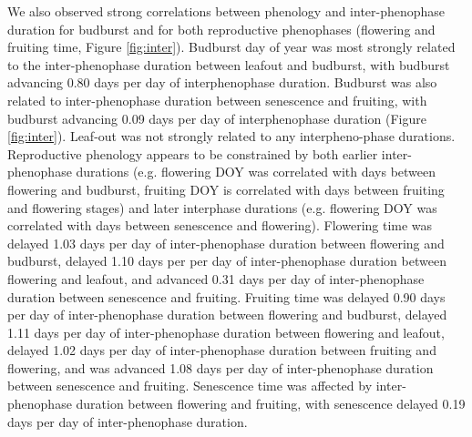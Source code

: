 \documentclass{article}
\begin{document}
\par We also observed strong correlations between phenology and inter-phenophase duration for budburst and for both reproductive phenophases (flowering and fruiting time, Figure \ref{fig:inter}). Budburst day of year was most strongly related to the inter-phenophase duration between leafout and budburst, with budburst advancing 0.80 days per day of interphenophase duration.  Budburst was also related to inter-phenophase duration between senescence and fruiting, with budburst advancing 0.09 days per day of interphenophase duration (Figure \ref{fig:inter}). Leaf-out was not strongly related to any interpheno-phase durations. Reproductive phenology appears to be constrained by both earlier inter-phenophase durations (e.g. flowering DOY was correlated with days between flowering and budburst, fruiting DOY is correlated with days between fruiting and flowering stages) and later interphase durations (e.g. flowering DOY was correlated with days between senescence and flowering). Flowering time was delayed 1.03 days per day of inter-phenophase duration between flowering and budburst, delayed 1.10 days per per day of inter-phenophase duration between flowering and leafout, and advanced 0.31 days per day of inter-phenophase duration between senescence and fruiting.  Fruiting time was delayed 0.90 days per day of inter-phenophase duration between flowering and budburst, delayed 1.11 days per day of inter-phenophase duration between flowering and leafout, delayed 1.02 days per day of inter-phenophase duration between fruiting and flowering, and was advanced 1.08 days per day of inter-phenophase duration between senescence and fruiting. Senescence time was affected by inter-phenophase duration between flowering and fruiting, with senescence delayed 0.19 days per day of inter-phenophase duration. 
\end{document}
